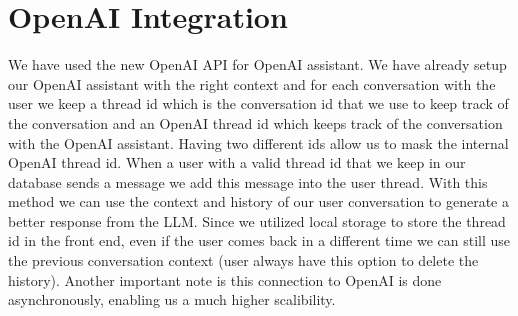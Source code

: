 \section{OpenAI Integration}
We have used the new OpenAI API for OpenAI assistant. We have already setup our OpenAI assistant with the right context and for each conversation with the user we keep a thread id which is the conversation id that we use to keep track of the conversation and
an OpenAI thread id which keeps track of the conversation with the OpenAI assistant. Having two different ids allow us to mask the internal OpenAI thread id.
When a user with a valid thread id that we keep in our database sends a message we add this message into the user thread.
With this method we can use the context and history of our user conversation to generate a better response from the LLM.
Since we utilized local storage to store the thread id in the front end, even if the user comes back in a different time we can still use the previous conversation context (user always have this option to delete the history).
Another important note is this connection to OpenAI is done asynchronously, enabling us a much higher scalibility.
